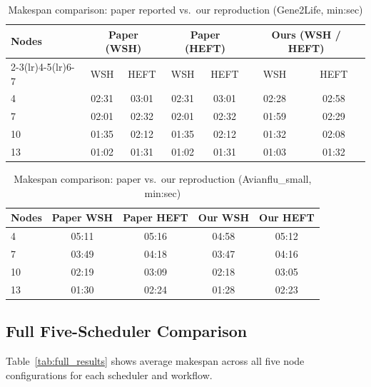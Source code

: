 \documentclass[12pt,a4paper]{article}
\begin{document}
\begin{table}[H]
\centering
\caption{Makespan comparison: paper reported vs.\ our reproduction (Gene2Life, min:sec)}
\label{tab:slr_paper}
\begin{tabular}{@{}lcccccc@{}}
\toprule
\multirow{2}{*}{\textbf{Nodes}} & \multicolumn{2}{c}{\textbf{Paper (WSH)}} & \multicolumn{2}{c}{\textbf{Paper (HEFT)}} & \multicolumn{2}{c}{\textbf{Ours (WSH / HEFT)}} \\
\cmidrule(lr){2-3}\cmidrule(lr){4-5}\cmidrule(lr){6-7}
 & WSH & HEFT & WSH & HEFT & WSH & HEFT \\
\midrule
4 & 02:31 & 03:01 & 02:31 & 03:01 & 02:28 & 02:58 \\
7 & 02:01 & 02:32 & 02:01 & 02:32 & 01:59 & 02:29 \\
10 & 01:35 & 02:12 & 01:35 & 02:12 & 01:32 & 02:08 \\
13 & 01:02 & 01:31 & 01:02 & 01:31 & 01:03 & 01:32 \\
\bottomrule
\end{tabular}
\end{table}

\begin{table}[H]
\centering
\caption{Makespan comparison: paper vs.\ our reproduction (Avianflu\_small, min:sec)}
\label{tab:makespan_paper}
\begin{tabular}{@{}lcccc@{}}
\toprule
\textbf{Nodes} & \textbf{Paper WSH} & \textbf{Paper HEFT} & \textbf{Our WSH} & \textbf{Our HEFT} \\
\midrule
4 & 05:11 & 05:16 & 04:58 & 05:12 \\
7 & 03:49 & 04:18 & 03:47 & 04:16 \\
10 & 02:19 & 03:09 & 02:18 & 03:05 \\
13 & 01:30 & 02:24 & 01:28 & 02:23 \\
\bottomrule
\end{tabular}
\end{table}

\subsection{Full Five-Scheduler Comparison}

Table~\ref{tab:full_results} shows average makespan across all five node configurations for each scheduler and workflow.
\end{document}
